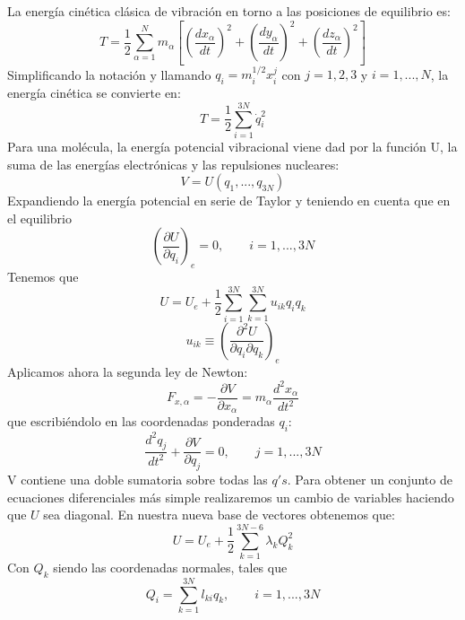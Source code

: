 \documentclass[a4paper]{article}
\begin{document}
La energía cinética clásica de vibración en torno a las posiciones de equilibrio es:
\begin{equation}
T= \frac{1}{2}\sum_{\alpha = 1}^Nm_\alpha\left[\left(\frac{dx_\alpha}{dt}\right)^2+\left(\frac{dy_\alpha}{dt}\right)^2+\left(\frac{dz_\alpha}{dt}\right)^2\right]
\end{equation}
Simplificando la notación y llamando $q_i=m_i^{1/2}x_i^j$ con $j=1,2,3$ y $i=1,...,N$, la energía cinética se convierte en:
\begin{equation}
T=\frac{1}{2}\sum_{i=1}^{3N}\dot q_i^2
\end{equation}
Para una molécula, la energía potencial vibracional viene dad por la función U, la suma de las energías electrónicas y las repulsiones nucleares:
\begin{equation}
V=U(q_1,...,q_{3N})
\end{equation}
Expandiendo la energía potencial en serie de Taylor y teniendo en cuenta que en el equilibrio
\begin{equation}
\left(\frac{\partial U}{\partial q_i}\right)_e=0, \qquad i= 1,...,3N
\end{equation}
Tenemos que
\begin{equation}
U = U_e + \frac{1}{2}\sum_{i=1}^{3N}\sum_{k=1}^{3N}u_{ik}q_iq_k
\end{equation}
\begin{equation}
u_{ik} \equiv \left(\frac{\partial^2U}{\partial q_i \partial q_k}\right)_e
\end{equation}
Aplicamos ahora la segunda ley de Newton:
\begin{equation}
F_{x,\alpha}=-\frac{\partial V}{\partial x_\alpha}=m_\alpha\frac{d^2x_\alpha}{dt^2}
\end{equation}
que escribiéndolo en las coordenadas ponderadas $q_i$:
\begin{equation}
\frac{d^2q_j}{dt^2}+\frac{\partial V}{\partial q_j}= 0, \qquad j=1,...,3N
\end{equation}
V contiene una doble sumatoria sobre todas las $q's$. Para obtener un conjunto de ecuaciones diferenciales más simple realizaremos un cambio de variables haciendo que $U$ sea diagonal.
En nuestra nueva base de vectores obtenemos que:
\begin{equation}
U=U_e + \frac{1}{2}\sum_{k=1}^{3N-6}\lambda_kQ_k^2
\end{equation}
Con $Q_k$ siendo las coordenadas normales, tales que
\begin{equation}
Q_i=\sum_{k=1}^{3N}l_{ki}q_k, \qquad i=1,...,3N
\end{equation}
\end{document}
